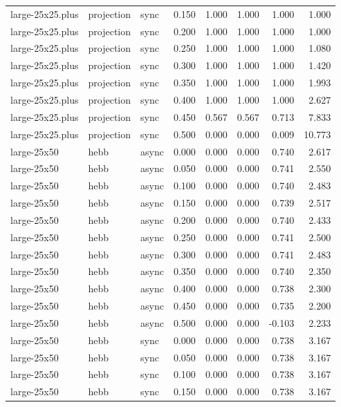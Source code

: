 \begin{tabular}{lllrrrrr}
large-25x25.plus & projection & sync & 0.150 & 1.000 & 1.000 & 1.000 & 1.000 \\
large-25x25.plus & projection & sync & 0.200 & 1.000 & 1.000 & 1.000 & 1.000 \\
large-25x25.plus & projection & sync & 0.250 & 1.000 & 1.000 & 1.000 & 1.080 \\
large-25x25.plus & projection & sync & 0.300 & 1.000 & 1.000 & 1.000 & 1.420 \\
large-25x25.plus & projection & sync & 0.350 & 1.000 & 1.000 & 1.000 & 1.993 \\
large-25x25.plus & projection & sync & 0.400 & 1.000 & 1.000 & 1.000 & 2.627 \\
large-25x25.plus & projection & sync & 0.450 & 0.567 & 0.567 & 0.713 & 7.833 \\
large-25x25.plus & projection & sync & 0.500 & 0.000 & 0.000 & 0.009 & 10.773 \\
large-25x50 & hebb & async & 0.000 & 0.000 & 0.000 & 0.740 & 2.617 \\
large-25x50 & hebb & async & 0.050 & 0.000 & 0.000 & 0.741 & 2.550 \\
large-25x50 & hebb & async & 0.100 & 0.000 & 0.000 & 0.740 & 2.483 \\
large-25x50 & hebb & async & 0.150 & 0.000 & 0.000 & 0.739 & 2.517 \\
large-25x50 & hebb & async & 0.200 & 0.000 & 0.000 & 0.740 & 2.433 \\
large-25x50 & hebb & async & 0.250 & 0.000 & 0.000 & 0.741 & 2.500 \\
large-25x50 & hebb & async & 0.300 & 0.000 & 0.000 & 0.741 & 2.483 \\
large-25x50 & hebb & async & 0.350 & 0.000 & 0.000 & 0.740 & 2.350 \\
large-25x50 & hebb & async & 0.400 & 0.000 & 0.000 & 0.738 & 2.300 \\
large-25x50 & hebb & async & 0.450 & 0.000 & 0.000 & 0.735 & 2.200 \\
large-25x50 & hebb & async & 0.500 & 0.000 & 0.000 & -0.103 & 2.233 \\
large-25x50 & hebb & sync & 0.000 & 0.000 & 0.000 & 0.738 & 3.167 \\
large-25x50 & hebb & sync & 0.050 & 0.000 & 0.000 & 0.738 & 3.167 \\
large-25x50 & hebb & sync & 0.100 & 0.000 & 0.000 & 0.738 & 3.167 \\
large-25x50 & hebb & sync & 0.150 & 0.000 & 0.000 & 0.738 & 3.167 \\

\end{tabular}
